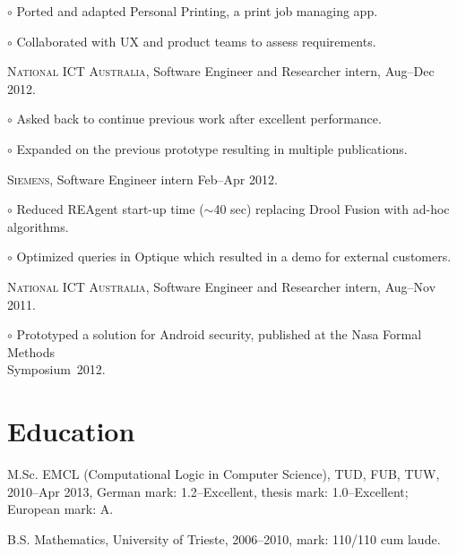 \documentclass[letterpaper]{article}
\renewenvironment{itemize}{
  \begin{list}{}{
    \setlength{\leftmargin}{1.5em}
  }
}{
  \end{list}
}
\newenvironment{no-indent-itemize}{
  \begin{list}{}{
    \setlength{\leftmargin}{0em}
  }
}{
  \end{list}
}
\def\tilde{$\scriptstyle\sim$}
\def\bullet{$\circ$\xspace}
\begin{document}
\begin{no-indent-itemize}
\begin{itemize}
    \item\bullet Ported and adapted Personal Printing, a print job managing app.
    \item\bullet Collaborated with UX and product teams to assess requirements.
  \end{itemize}
  \item \textsc{National ICT Australia}, Software Engineer and Researcher intern, Aug--Dec 2012. 
  \begin{itemize}
    \item\bullet Asked back to continue previous work after excellent performance.
    \item\bullet Expanded on the previous prototype resulting in multiple publications.
  \end{itemize}
  \item \textsc{Siemens}, Software Engineer intern Feb--Apr 2012.
  \begin{itemize}
    \item\bullet Reduced REAgent start-up time (\tilde 40 sec) replacing Drool Fusion with 
          ad-hoc algorithms.
    \item\bullet Optimized queries in Optique which resulted in a demo for external customers.
  \end{itemize}
  \item \textsc{National ICT Australia}, Software Engineer and Researcher intern, Aug--Nov 2011. 
  \begin{itemize}
    \item\bullet Prototyped a solution for Android security, published at the Nasa Formal Methods \\
    \phantom{\bullet }Symposium~2012.
  \end{itemize}
\end{no-indent-itemize}

\section*{Education}
\begin{no-indent-itemize}
  \item M.Sc. EMCL (Computational Logic in Computer Science), TUD, FUB, TUW, 2010--Apr 2013, 
        German mark: 1.2--Excellent, thesis mark: 1.0--Excellent; European mark: A.
  \item B.S. Mathematics, University of Trieste, 2006--2010, mark: 110/110 cum laude. 
\end{no-indent-itemize}
\end{document}
